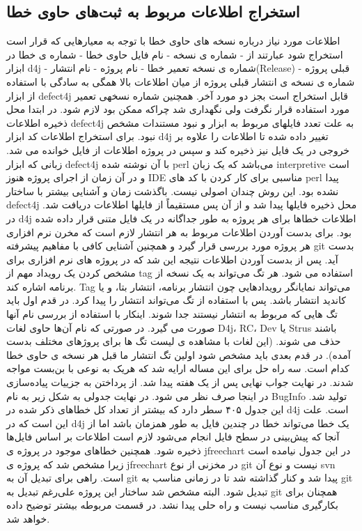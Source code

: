 \subsection{ استخراج اطلاعات مربوط به ثبت‌های   حاوی خطا}
اطلاعات مورد نیاز درباره نسخه های حاوی خطا با توجه به معیارهایی که قرار است استخراج شود عبارتند از 
- شماره ی نسخه 
- نام فایل حاوی خطا
- شماره ی خطا در ابزار d4j
- شماره ی نسخه تعمیر خطا
- نام پروژه
- نام انتشار(Release) قبلی پروژه
- شماره ی نسخه ی انتشار قبلی پروژه
از میان اطلاعات بالا همگی به سادگی با استفاده از ابزار defect4j قابل استخراج است بجز دو مورد آخر. همچنین شماره نسخه­ی تعمیر مورد استفاده قرار نگرفت ولی نگهداری شد چراکه ممکن بود لازم شود. در ابتدا محل ذخیره اطلاعات defect4j  به علت تعدد فایلهای مربوط به ابزار و نبود مستندات مشخص نبود. برای استخراج اطلاعات کد ابزار d4j تغییر داده شده تا اطلاعات را علاوه بر خروجی در یک فایل نیز ذخیره کند و سپس در پروژه اطلاعات از فایل خوانده می شد. زبانی که ابزار defect4j با آن نوشته شده perl می‌باشد که یک زبان interpretive است و در آن زمان از اجرای پروژه هنوز IDE‌ مناسبی برای کار کردن با کد های perl پیدا نشده بود. این روش چندان اصولی نیست. با‌گذشت زمان و آشنایی بیشتر با ساختار defect4j محل ذخیره فایلها پیدا شد و از آن پس مستقیماً از فایلها اطلاعات دریافت شد. در d4j اطلاعات خطاها برای هر پروژه به طور جداگانه در یک فایل متنی قرار داده شده بود. 
برای بدست آوردن اطلاعات مربوط به هر انتشار لازم است که مخرن نرم افزاری هر پروژه مورد بررسی قرار گیرد و همچنین آشنایی کافی با مفاهیم پیشرفته git بدست آید. پس از بدست آوردن اطلاعات نتیجه این شد که در پروژه های نرم افزاری برای مشخص کردن یک رویداد مهم از tag استفاده می شود. هر تگ می‌تواند به یک نسخه از برنامه اشاره کند. Tag می‌تواند نمایانگر رویدادهایی چون انتشار برنامه، انتشار بتا، و یا کاندید انتشار باشد. پس با استفاده از تگ می‌تواند انتشار را پیدا کرد.
در قدم اول باید تگ هایی که مربوط به انتشار نیستند جدا شوند. اینکار با استفاده از بررسی نام آنها صورت می گیرد. در صورتی که نام آن‌ها حاوی لغات D4j، RC، Dev یا Strus باشند حذف می شوند. (این لغات با مشاهده ی لیست تگ ها برای پروژهای مختلف بدست آمده). 
در قدم بعدی باید مشخص شود اولین تگ انتشار ما قبل هر نسخه ی حاوی خطا کدام است. 
سه راه حل برای  این مساله ارايه شد که هریک به نوعی با بن‌بست مواجه شدند.  در نهایت جواب نهایی پس از یک هفته پیدا شد. از پرداختن به جزییات پیاده‌سازی در اینجا صرف نظر می شود. در نهایت جدولی به شکل زیر به نام BugInfo تولید شد.
این جدول ۴۰۵ سطر دارد که بیشتر از تعداد کل خطاهای ذکر شده در d4j است. علت این است که در d4j یک خطا می‌تواند خطا در چندین فایل به طور همزمان باشد اما از آنجا که پیش‌بینی در سطح فایل انجام می‌شود لازم است اطلاعات بر اساس فایل‌ها ذخیره شود. همچنین خطاهای موجود در پروژه ی jfreechart در این جدول نیامده است زیرا مشخص شد که پروژه ی jfreechart در مخزنی از نوع git نیست و نوع آن svn‌ است. راهی برای تبدیل آن به git پیدا شد و کنار گذاشته شد تا در زمانی مناسب به git تبدیل شود. البته مشخص شد ساختار این پروژه علی‌رغم تبدیل به git همچنان برای بکارگیری مناسب نیست و راه حلی پیدا نشد. در قسمت مربوطه بیشتر توضیح داده خواهد شد. 

